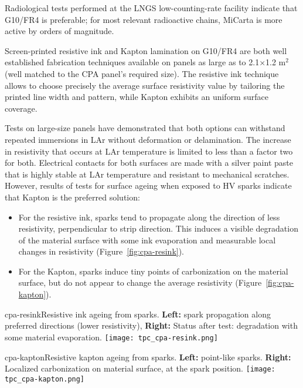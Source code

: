  Radiological tests performed at the LNGS low-counting-rate facility indicate that G10/FR4 is preferable; for most relevant radioactive chains, MiCarta is more active by orders of magnitude.

Screen-printed resistive ink and Kapton lamination on G10/FR4 are both well established fabrication techniques available on panels as large as to 2.1$\times$1.2 m$^2$ (well matched to the CPA panel's required size). The resistive ink technique allows to choose precisely the average surface resistivity value by tailoring the printed line width and pattern, while Kapton exhibits an uniform surface coverage. 


Tests on large-size panels have demonstrated that both options can withstand repeated immersions in LAr without deformation or delamination. The increase in resistivity that occurs at LAr temperature is limited to less than a factor two for both. Electrical contacts for both surfaces are made with a silver paint paste that is highly stable at LAr temperature and resistant to mechanical scratches.
%
However, results of tests for surface ageing when exposed to HV sparks indicate that Kapton is the preferred solution:
\begin{itemize}	


\item For the resistive ink, sparks tend to propagate along the direction of less resistivity, perpendicular to strip direction. This induces a visible degradation of the material surface with some  ink evaporation and measurable local changes in resistivity (Figure~\ref{fig:cpa-resink}).
\item For the Kapton, sparks induce tiny points of carbonization on the material surface, but do not appear to change the average resistivity (Figure~\ref{fig:cpa-kapton}). 
\end{itemize}


\begin{cdrfigure}{cpa-resink}{Resistive ink ageing from sparks. 
 {\bf Left:} spark propagation along preferred directions (lower resistivity), {\bf Right:} Status after test: degradation with some material evaporation.} 
\texttt{[image: tpc\_cpa-resink.png]}
\end{cdrfigure}

\begin{cdrfigure}{cpa-kapton}{Resistive kapton ageing from sparks. 
 {\bf Left:} point-like sparks. {\bf Right:} Localized carbonization on material surface, at the spark position.}
\texttt{[image: tpc\_cpa-kapton.png]}
\end{cdrfigure}

